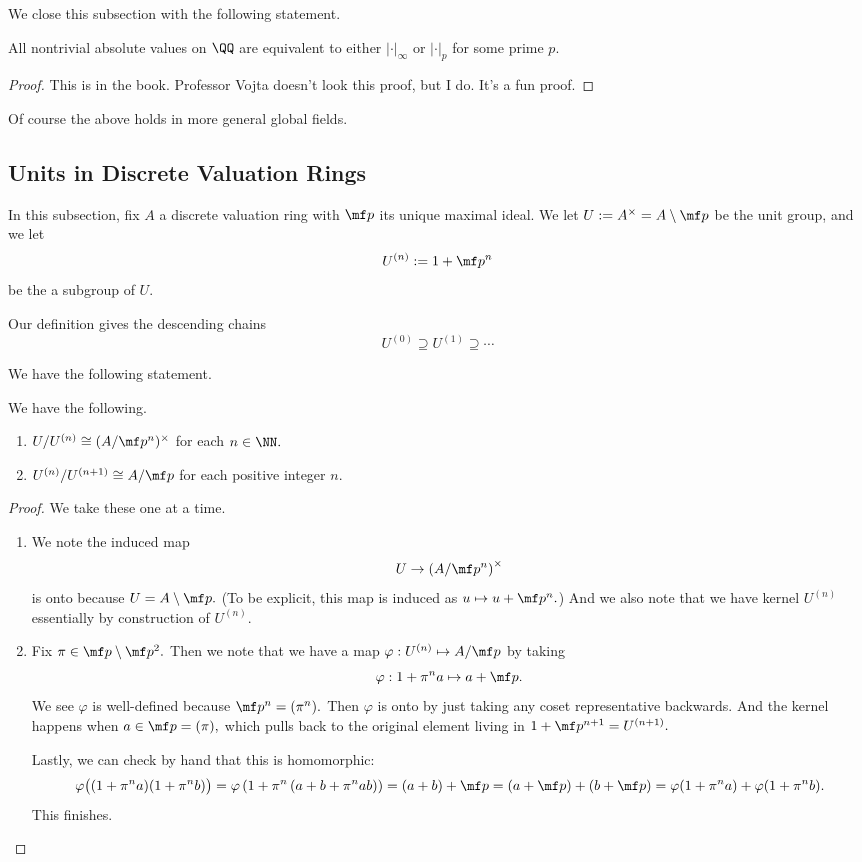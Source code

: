 We close this subsection with the following statement.
\begin{theorem}
	All nontrivial absolute values on $\QQ$ are equivalent to either $|\cdot|_\infty$ or $|\cdot|_p$ for some prime $p.$
\end{theorem}
\begin{proof}
	This is in the book. Professor Vojta doesn't look this proof, but I do. It's a fun proof.
\end{proof}
\begin{remark}[Nir]
	Of course the above holds in more general global fields.
\end{remark}

\subsection{Units in Discrete Valuation Rings}
In this subsection, fix $A$ a discrete valuation ring with $\mf p$ its unique maximal ideal. We let $U:=A^\times=A\setminus\mf p$ be the unit group, and we let
\[U^{(n)}:=1+\mf p^n\]
be the a subgroup of $U.$
\begin{remark}
	Our definition gives the descending chains
	\[U^{(0)}\supseteq U^{(1)}\supseteq\cdots\]
\end{remark}

We have the following statement.
\begin{proposition}
	We have the following.
	\begin{enumerate}[label=(\alph*)]
		\item $U/U^{(n)}\cong(A/\mf p^n)^\times$ for each $n\in\NN.$
		\item $U^{(n)}/U^{(n+1)}\cong A/\mf p$ for each positive integer $n.$
	\end{enumerate}
\end{proposition}
\begin{proof}
	We take these one at a time.
	\begin{enumerate}
		\item We note the induced map
		\[U\to \left(A/\mf p^n\right)^\times\]
		is onto because $U=A\setminus\mf p.$ (To be explicit, this map is induced as $u\mapsto u+\mf p^n.$) And we also note that we have kernel $U^{(n)}$ essentially by construction of $U^{(n)}.$
		\item Fix $\pi\in\mf p\setminus\mf p^2.$ Then we note that we have a map $\varphi:U^{(n)}\mapsto A/\mf p$ by taking
		\[\varphi:1+\pi^na\mapsto a+\mf p.\]
		We see $\varphi$ is well-defined because $\mf p^n=(\pi^n).$ Then $\varphi$ is onto by just taking any coset representative backwards. And the kernel happens when $a\in\mf p=(\pi),$ which pulls back to the original element living in $1+\mf p^{n+1}=U^{(n+1)}.$
		
		Lastly, we can check by hand that this is homomorphic:
		\[\varphi\big((1+\pi^na)(1+\pi^nb)\big)=\varphi\left(1+\pi^n\left(a+b+\pi^nab\right)\right)=(a+b)+\mf p=(a+\mf p)+(b+\mf p)=\varphi(1+\pi^na)+\varphi(1+\pi^nb).\]
		This finishes.
		\qedhere
	\end{enumerate}
\end{proof}